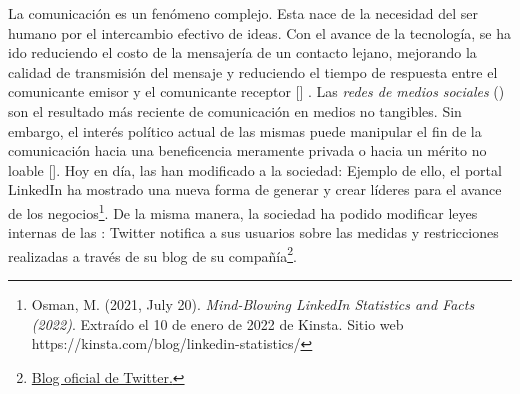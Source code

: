 \documentclass[../main.tex]{subfiles}
\begin{document}
\onehalfspacing



La comunicación es un fenómeno complejo. Esta nace de la necesidad del ser humano por el intercambio efectivo de ideas. Con el avance de la tecnología, se ha ido reduciendo el costo de la mensajería de un contacto lejano, mejorando la calidad de transmisión del mensaje y reduciendo el tiempo de respuesta entre el comunicante emisor y el comunicante receptor [\cite{alhadlaq2016technology}] . Las \textit{redes de medios sociales} (\RMS) son el resultado más reciente de comunicación en medios no tangibles. Sin embargo, el interés político actual de las mismas puede manipular el fin de la comunicación hacia una beneficencia meramente privada o hacia un mérito no loable [\cite{Chen2021}]. Hoy en día, las \RMS han modificado a la sociedad: Ejemplo de ello, el portal LinkedIn ha mostrado una nueva forma de generar y crear líderes para el avance de los negocios\footnote{Osman, M. (2021, July 20). \textit{Mind-Blowing LinkedIn Statistics and Facts (2022)}. Extraído el 10 de enero de 2022 de Kinsta. Sitio web  https://kinsta.com/blog/linkedin-statistics/}. De la misma manera, la sociedad ha podido modificar leyes internas de las \RMS: Twitter notifica a sus usuarios sobre las medidas y restricciones realizadas a través de su blog de su compañía\footnote{\href{https://blog.twitter.com/en\_us/topics/company.html}{Blog oficial de Twitter.} }. 




\end{document}
